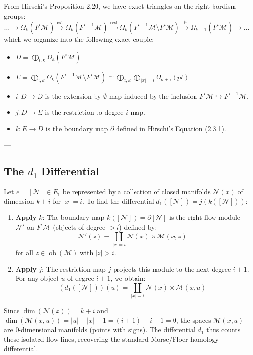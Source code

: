 \documentclass[a4paper,11pt]{article}
\theoremstyle{plain}
\theoremstyle{definition}
\theoremstyle{remark}
\newcommand{\flowM}{\mathcal{M}}
\newcommand{\ob}{\operatorname{ob}}
\begin{document}
From Hirschi's Proposition 2.20, we have exact triangles on the right bordism groups:
\[
\dots \to \Omega_k(F^i \flowM) \xrightarrow{\text{ext}} \Omega_k(F^{i-1} \flowM) \xrightarrow{\text{rest}} \Omega_k(F^{i-1}\flowM \setminus F^i \flowM) \xrightarrow{\partial} \Omega_{k-1}(F^i \flowM) \to \dots
\]
which we organize into the following exact couple:
\begin{itemize}
    \item $D = \bigoplus_{i, k} \Omega_k(F^i \flowM)$
    \item $E = \bigoplus_{i, k} \Omega_k(F^{i-1}\flowM \setminus F^i \flowM) \cong \bigoplus_{i, k} \bigoplus_{|x|=i} \Omega_{k+i}(pt)$
    \item $i \colon D \to D$ is the extension-by-$\emptyset$ map induced by the inclusion $F^i \flowM \hookrightarrow F^{i-1}\flowM$.
    \item $j \colon D \to E$ is the restriction-to-degree-$i$ map.
    \item $k \colon E \to D$ is the boundary map $\partial$ defined in Hirschi's Equation (2.3.1).
\end{itemize}

---

\subsection{The $d_1$ Differential}

Let $e = [\mathcal{N}] \in E_1$ be represented by a collection of closed manifolds $\mathcal{N}(x)$ of dimension $k+i$ for $|x|=i$. To find the differential $d_1([\mathcal{N}]) = j(k([\mathcal{N}]))$:
\begin{enumerate}
    \item \textbf{Apply $k$}: The boundary map $k([\mathcal{N}]) = \partial [\mathcal{N}]$ is the right flow module $\mathcal{N}'$ on $F^i \flowM$ (objects of degree $> i$) defined by:
    \[
    \mathcal{N}'(z) = \coprod_{|x|=i} \mathcal{N}(x) \times \flowM(x, z)
    \]
    for all $z \in \ob(\flowM)$ with $|z| > i$.
    \item \textbf{Apply $j$}: The restriction map $j$ projects this module to the next degree $i+1$. For any object $u$ of degree $i+1$, we obtain:
    \[
    (d_1([\mathcal{N}]))(u) = \coprod_{|x|=i} \mathcal{N}(x) \times \flowM(x, u)
    \]
\end{enumerate}
Since $\dim(\mathcal{N}(x)) = k+i$ and $\dim(\flowM(x, u)) = |u| - |x| - 1 = (i+1) - i - 1 = 0$, the spaces $\flowM(x, u)$ are $0$-dimensional manifolds (points with signs). The differential $d_1$ thus counts these isolated flow lines, recovering the standard Morse/Floer homology differential.
\end{document}
